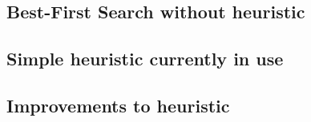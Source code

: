 \subsection{Best-First Search without heuristic}

\subsection{Simple heuristic currently in use}

\subsection{Improvements to heuristic}
